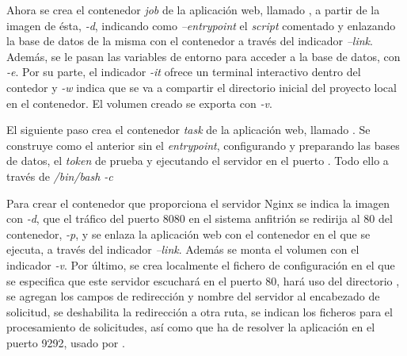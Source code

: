 Ahora se crea el contenedor \textit{job} de la aplicación web, llamado , a partir de la imagen de ésta, \textit{\--d}, indicando como \textit{\---entrypoint} el \textit{script} comentado y enlazando la base de datos de la misma con el contenedor  a través del indicador \textit{\---link}. Además, se le pasan las variables de entorno para acceder a la base de datos, con \textit{\--e}. Por su parte, el indicador \textit{\--it} ofrece un terminal interactivo dentro del contedor y \textit{\--w} indica que se va a compartir el directorio inicial del proyecto local en el contenedor. El volumen creado se exporta con \textit{\--v}.

El siguiente paso crea el contenedor \textit{task} de la aplicación web, llamado . Se construye como el anterior sin el \textit{entrypoint}, configurando y preparando las bases de datos, el \textit{token} de prueba y ejecutando el servidor  en el puerto . Todo ello a través de \textit{/bin/bash \--c}

Para crear el contenedor  que proporciona el servidor Nginx se indica la imagen con \textit{\--d}, que el tráfico del puerto 8080 en el sistema anfitrión se redirija al 80 del contenedor, \textit{\--p}, y se enlaza la aplicación web con el contenedor en el que se ejecuta, a través del indicador \textit{\---link}. Además se monta el volumen  con el indicador \textit{\--v}. Por último, se crea localmente el fichero de configuración  en el que se especifica que este servidor escuchará en el puerto 80, hará uso del directorio , se agregan los campos de redirección y nombre del servidor al encabezado de solicitud, se deshabilita la redirección a otra ruta, se indican los ficheros para el procesamiento de solicitudes, así como que ha de resolver la aplicación en el puerto 9292, usado por .  

